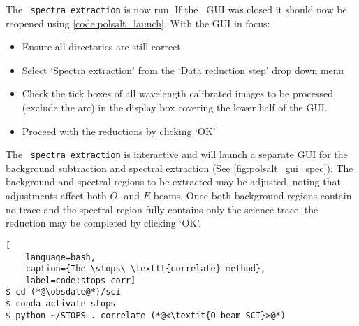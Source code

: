 The \polsalt\ \texttt{spectra extraction} is now run. If the \polsalt\ \gls{GUI} was closed it should now be reopened using \autoref{code:polsalt_launch}. With the \gls{GUI} in focus:
\begin{itemize}
    \item Ensure all directories are still correct
    \item Select `Spectra extraction' from the `Data reduction step' drop down menu
    \item Check the tick boxes of all wavelength calibrated images to be processed (exclude the arc) in the display box covering the lower half of the \gls{GUI}.
    \item Proceed with the reductions by clicking `OK'
\end{itemize}

The \polsalt\ \texttt{spectra extraction} is interactive and will launch a separate \gls{GUI} for the background subtraction and spectral extraction (See \autoref{fig:polsalt_gui_spec}). The background and spectral regions to be extracted may be adjusted, noting that adjustments affect both $O$- and $E$-beams. Once both background regions contain no trace and the spectral region fully contains only the science trace, the reduction may be completed by clicking `OK'.

\begin{lstlisting}[
    language=bash,
    caption={The \stops\ \texttt{correlate} method},
    label=code:stops_corr]
$ cd (*@\obsdate@*)/sci
$ conda activate stops
$ python ~/STOPS . correlate (*@<\textit{O-beam SCI}>@*)
\end{lstlisting}

